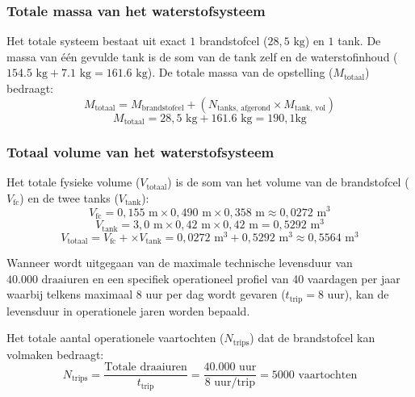 \subsubsection*{Totale massa van het waterstofsysteem}
Het totale systeem bestaat uit exact $1$ brandstofcel ($28{,}5 \text{ kg}$) en $1$ tank. De massa van één gevulde tank is de som van de tank zelf en de waterstofinhoud ($154.5 \text{ kg} + 7.1 \text{ kg} = 161.6 \text{ kg}$). De totale massa van de opstelling ($M_{\text{totaal}}$) bedraagt:
\begin{equation}
M_{\text{totaal}} = M_{\text{brandstofcel}} + \left(N_{\text{tanks, afgerond}} \times M_{\text{tank, vol}}\right)
\end{equation}
\begin{equation}
M_{\text{totaal}} = 28{,}5 \text{ kg} +  161.6 \text{ kg} = 190{,}1 \text{kg}
\end{equation}

\subsubsection*{Totaal volume van het waterstofsysteem}
Het totale fysieke volume ($V_{\text{totaal}}$) is de som van het volume van de brandstofcel ($V_{\text{fc}}$) en de twee tanks ($V_{\text{tank}}$):
\begin{equation}
V_{\text{fc}} = 0{,}155 \text{ m} \times 0{,}490 \text{ m} \times 0{,}358 \text{ m} \approx 0{,}0272 \text{ m}^3
\end{equation}
\begin{equation}
V_{\text{tank}} = 3{,}0 \text{ m} \times 0{,}42 \text{ m} \times 0{,}42 \text{ m} = 0{,}5292 \text{ m}^3
\end{equation}
\begin{equation}
V_{\text{totaal}} = V_{\text{fc}} + \times V_{\text{tank}} = 0{,}0272 \text{ m}^3 + 0{,}5292 \text{ m}^3 \approx 0{,}5564 \text{ m}^3
\end{equation}

\noindent Wanneer wordt uitgegaan van de maximale technische levensduur van $40.000 \text{ draaiuren}$ \cite{CORDISMethapu2012} en een specifiek operationeel profiel van 40 vaardagen per jaar waarbij telkens maximaal 8 uur per dag wordt gevaren ($t_{\text{trip}} = 8 \text{ uur}$), kan de levensduur in operationele jaren worden bepaald.

Het totale aantal operationele vaartochten ($N_{\text{trips}}$) dat de brandstofcel kan volmaken bedraagt:
\begin{equation}
N_{\text{trips}} = \frac{\text{Totale draaiuren}}{t_{\text{trip}}} = \frac{40.000 \text{ uur}}{8 \text{ uur/trip}} = 5000 \text{ vaartochten}
\end{equation}

